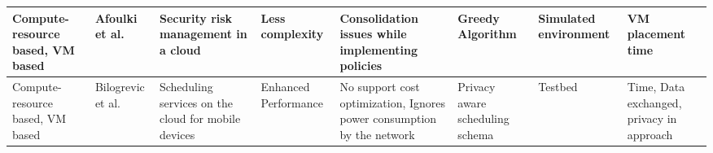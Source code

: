 \begin{table*}[!htbp]
{\begin{tabular}{|g{2cm} p{2cm} p{2cm} p{2cm} p{2cm} p{2cm} p{2cm} p{1.9cm}|}
Compute-resource based, VM based & Afoulki et al.~\cite{afoulki2011security}& Security risk management in a cloud &  Less complexity & Consolidation issues while implementing policies & Greedy Algorithm & Simulated environment & VM placement time  
\\ \hline 

Compute-resource based, VM based & Bilogrevic et al.~\cite{bilogrevic2011meetings} & Scheduling services on the cloud for mobile devices & Enhanced Performance & No support cost optimization, Ignores power consumption by the network & Privacy aware scheduling schema & Testbed & Time, Data exchanged, privacy in approach 
 \\ \hline
\end{tabular}
}

\end{table*}
